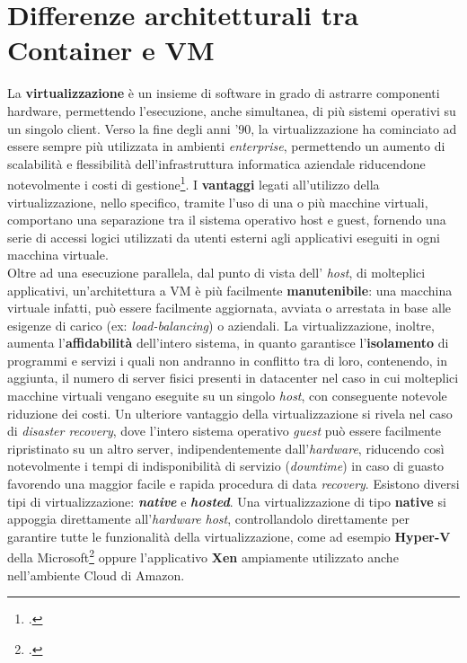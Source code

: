 \section{Differenze architetturali tra Container e VM}
La \textbf{virtualizzazione} è un insieme di software in grado di astrarre componenti \gls{hardware}, permettendo l'esecuzione, anche simultanea, di più \gls{sistemi operativi} su un singolo \gls{client}. Verso la fine degli anni '90, la virtualizzazione ha cominciato ad essere sempre più utilizzata in ambienti \textit{enterprise}, permettendo un aumento di scalabilità e flessibilità dell'infrastruttura informatica aziendale riducendone notevolmente i costi di gestione\footcite{fonte: https://www.vmware.com/it/solutions/virtualization.html}. I \textbf{vantaggi} legati all'utilizzo della virtualizzazione, nello specifico, tramite l'uso di una o più macchine virtuali, comportano una separazione tra il sistema operativo \gls{host} e \gls{guest}, fornendo una serie di accessi logici utilizzati da utenti esterni agli applicativi eseguiti in ogni macchina virtuale. \\
Oltre ad una esecuzione parallela, dal punto di vista dell' \textit{host}, di molteplici applicativi, un'architettura a VM è più facilmente \textbf{manutenibile}: una macchina virtuale infatti, può essere facilmente aggiornata, avviata o arrestata in base alle esigenze di carico (ex: \textit{load-balancing}) o aziendali.
La virtualizzazione, inoltre, aumenta l'\textbf{affidabilità} dell'intero sistema, in quanto garantisce l'\textbf{isolamento} di programmi e servizi i quali non andranno in conflitto tra di loro, contenendo, in aggiunta, il numero di server fisici presenti in \gls{datacenter} nel caso in cui molteplici macchine virtuali vengano eseguite su un singolo \textit{host}, con conseguente notevole riduzione dei costi.
Un ulteriore vantaggio della virtualizzazione si rivela nel caso di \textit{\gls{disaster recovery}}, dove l'intero sistema operativo \textit{guest} può essere facilmente ripristinato su un altro server, indipendentemente dall'\textit{hardware}, riducendo così notevolmente i tempi di indisponibilità di servizio (\textit{downtime}) in caso di guasto favorendo una maggior facile e rapida procedura di data \textit{\gls{recovery}}.
Esistono diversi tipi di virtualizzazione: \textbf{\textit{native}} e \textbf{\textit{hosted}}.
Una virtualizzazione di tipo \textbf{native} si appoggia direttamente all'\textit{hardware} \textit{host}, controllandolo direttamente per garantire tutte le funzionalità della virtualizzazione, come ad esempio \textbf{\gls{Hyper-V}} della Microsoft\footcite{questa funzionalita' e' presente solamente nelle versioni Pro e Server di Windows 10} oppure l'applicativo \textbf{\gls{Xen}} ampiamente utilizzato anche nell'ambiente Cloud di Amazon.
